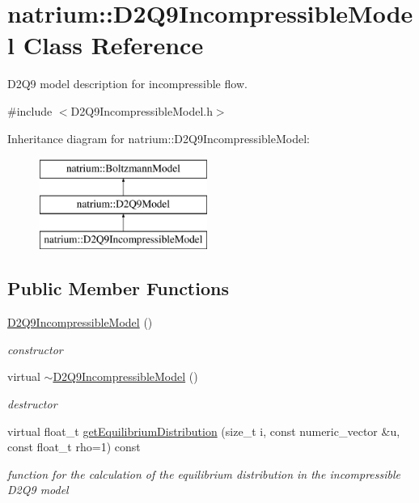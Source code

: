\hypertarget{classnatrium_1_1D2Q9IncompressibleModel}{\section{natrium\-:\-:\-D2\-Q9\-Incompressible\-Model \-Class \-Reference}
\label{classnatrium_1_1D2Q9IncompressibleModel}
}


\-D2\-Q9 model description for incompressible flow.  




{\ttfamily \#include $<$\-D2\-Q9\-Incompressible\-Model.\-h$>$}

\-Inheritance diagram for natrium\-:\-:\-D2\-Q9\-Incompressible\-Model\-:\begin{figure}[H]
\begin{center}
\leavevmode
\includegraphics[height=3.000000cm]{classnatrium_1_1D2Q9IncompressibleModel}
\end{center}
\end{figure}
\subsection*{\-Public \-Member \-Functions}
\begin{DoxyCompactItemize}
\item 
\hypertarget{classnatrium_1_1D2Q9IncompressibleModel_a50cce01cb87eb811013079d73c4baaf0}{\hyperlink{classnatrium_1_1D2Q9IncompressibleModel_a50cce01cb87eb811013079d73c4baaf0}{\-D2\-Q9\-Incompressible\-Model} ()}\label{classnatrium_1_1D2Q9IncompressibleModel_a50cce01cb87eb811013079d73c4baaf0}

\begin{DoxyCompactList}\small\item\em constructor \end{DoxyCompactList}\item 
virtual \hyperlink{classnatrium_1_1D2Q9IncompressibleModel_a6e757941f7ca2c5a6148893147211724}{$\sim$\-D2\-Q9\-Incompressible\-Model} ()
\begin{DoxyCompactList}\small\item\em destructor \end{DoxyCompactList}\item 
virtual float\-\_\-t \hyperlink{classnatrium_1_1D2Q9IncompressibleModel_a437bce6e0d6f35ca3ff2df4bbe650043}{get\-Equilibrium\-Distribution} (size\-\_\-t i, const numeric\-\_\-vector \&u, const float\-\_\-t rho=1) const 
\begin{DoxyCompactList}\small\item\em function for the calculation of the equilibrium distribution in the incompressible \-D2\-Q9 model \end{DoxyCompactList}\end{DoxyCompactItemize}


